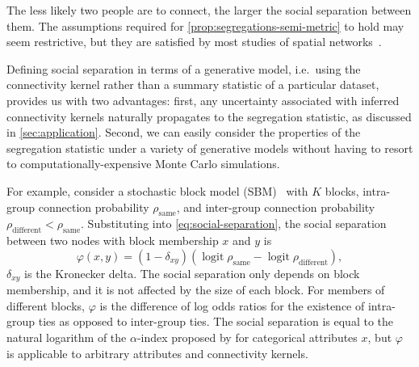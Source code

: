 \documentclass{scrartcl}
\DeclareMathOperator{\logit}{logit}
\begin{document}
\begin{refsection}
The less likely two people are to connect, the larger the social separation between them. The assumptions required for \cref{prop:segregations-semi-metric} to hold may seem restrictive, but they are satisfied by most studies of spatial networks~\cite{Barnett2007,Lambiotte2008,Butts2012,Expert2011}.

Defining social separation in terms of a generative model, i.e.\ using the connectivity kernel rather than a summary statistic of a particular dataset, provides us with two advantages: first, any uncertainty associated with inferred connectivity kernels naturally propagates to the segregation statistic, as discussed in \cref{sec:application}. Second, we can easily consider the properties of the segregation statistic under a variety of generative models without having to resort to computationally-expensive Monte Carlo simulations.

For example, consider a stochastic block model (SBM)~\cite{Snijders2011} with $K$ blocks, intra-group connection probability $\rho_\mathrm{same}$, and inter-group connection probability $\rho_\mathrm{different}<\rho_\mathrm{same}$. Substituting into \cref{eq:social-separation}, the social separation between two nodes with block membership $x$ and $y$ is
\begin{equation}
    \varphi(x, y) = \left(1-\delta_{xy}\right)\left(\logit\rho_\mathrm{same}-\logit\rho_\mathrm{different}\right),\label{eq:social-separation-sbm}
\end{equation}
$\delta_{xy}$ is the Kronecker delta. The social separation only depends on block membership, and it is not affected by the size of each block. For members of different blocks, $\varphi$ is the difference of log odds ratios for the existence of intra-group ties as opposed to inter-group ties. The social separation is equal to the natural logarithm of the $\alpha$-index proposed by \textcite{Moody2001} for categorical attributes $x$, but $\varphi$ is applicable to arbitrary attributes and connectivity kernels.


\end{refsection}
\end{document}
